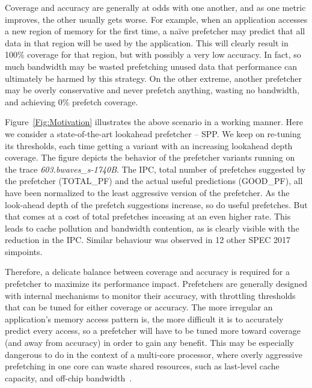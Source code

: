 Coverage and accuracy are generally at odds with one another, and as one metric improves, the other
usually gets worse.  For example, when an application accesses a new region of memory for the first
time, a na\"ive prefetcher may predict that all data in that region will be used by the application.
This will clearly result in 100\% coverage for that region, but with possibly a very low accuracy.
In fact, so much bandwidth may be wasted prefetching unused data that performance can ultimately be
harmed by this strategy.  On the other extreme, another prefetcher may be overly
conservative and never prefetch anything, wasting no bandwidth, and achieving 0\% prefetch
coverage.

Figure~\ref{Fig:Motivation} illustrates the above scenario in a working manner.
Here we consider a state-of-the-art lookahead prefetcher -- SPP. We keep on 
re-tuning its thresholds, each time getting a variant with an increasing lookahead 
depth coverage. The figure depicts the behavior of the prefetcher variants running 
on the trace \textit{603.bwaves\_s-1740B}. The IPC, total number of prefetches 
suggested by the prefetcher (TOTAL\_PF) and the actual useful predictions (GOOD\_PF),
all have been normalized to the least aggressive version of the prefetcher. 
As the look-ahead depth of the prefetch suggestions increase, so do useful prefetches. 
But that comes at a cost of total prefetches inceasing at an even higher rate. This leads 
to cache pollution and bandwidth contention, as is clearly visible with the reduction in 
the IPC. Similar behaviour was observed in 12 other SPEC 2017 simpoints. 

Therefore, a delicate balance between coverage and accuracy is required for a prefetcher to maximize
its performance impact.  Prefetchers are generally designed with internal mechanisms to
monitor their accuracy, with throttling thresholds that can be tuned for either coverage 
or accuracy.  The more irregular an application's memory access pattern is, the more difficult
it is to accurately predict every access, so a prefetcher will have to be tuned more toward
coverage (and away from accuracy) in order to gain any benefit.  This may be especially dangerous
to do in the context of a multi-core processor, where overly aggressive prefetching in one core can
waste shared resources, such as last-level cache capacity, and off-chip bandwidth~\cite{Friendly}.

